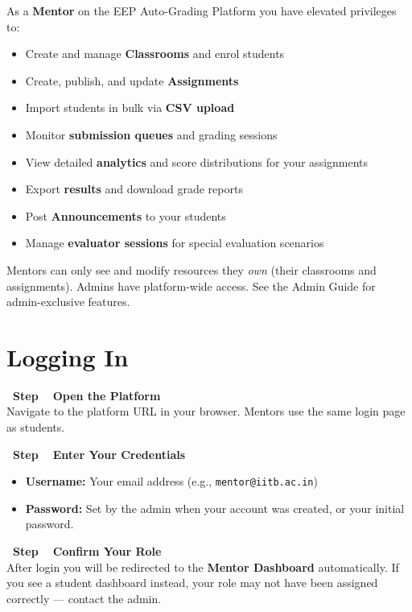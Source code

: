 \documentclass[12pt,a4paper]{article}
\newcounter{stepnum}
\newcommand{\step}[1]{%
  \stepcounter{stepnum}%
  \vspace{6pt}%
  \noindent\colorbox{mentorPurple}{\color{white}\bfseries\small\ Step \thestepnum\ }%
  \hspace{4pt}\textbf{#1}\\[4pt]%
}
\begin{document}
As a \textbf{Mentor} on the EEP Auto-Grading Platform you have elevated privileges to:

\begin{itemize}[leftmargin=*]
  \item Create and manage \textbf{Classrooms} and enrol students
  \item Create, publish, and update \textbf{Assignments}
  \item Import students in bulk via \textbf{CSV upload}
  \item Monitor \textbf{submission queues} and grading sessions
  \item View detailed \textbf{analytics} and score distributions for your assignments
  \item Export \textbf{results} and download grade reports
  \item Post \textbf{Announcements} to your students
  \item Manage \textbf{evaluator sessions} for special evaluation scenarios
\end{itemize}

\begin{infobox}
  Mentors can only see and modify resources they \emph{own} (their classrooms and assignments). Admins have platform-wide access. See the Admin Guide for admin-exclusive features.
\end{infobox}

\section{Logging In}

\setcounter{stepnum}{0}

\step{Open the Platform}
Navigate to the platform URL in your browser. Mentors use the same login page as students.

\step{Enter Your Credentials}
\begin{itemize}
  \item \textbf{Username:} Your email address (e.g., \texttt{mentor@iitb.ac.in})
  \item \textbf{Password:} Set by the admin when your account was created, or your initial password.
\end{itemize}

\step{Confirm Your Role}
After login you will be redirected to the \textbf{Mentor Dashboard} automatically. If you see a student dashboard instead, your role may not have been assigned correctly — contact the admin.
\end{document}
